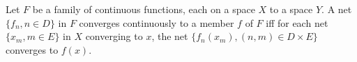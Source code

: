 Let $F$ be a family of continuous functions, each on a space $X$ to a space $Y$. A net $\{f_n, n \in D\}$ in $F$ converges continuously to a member $f$ of $F$ iff for each net $\{x_m, m \in E\}$ in $X$ converging to $x$, the net $\{f_n(x_m), (n,m) \in D \times E\}$ converges to $f(x)$.
